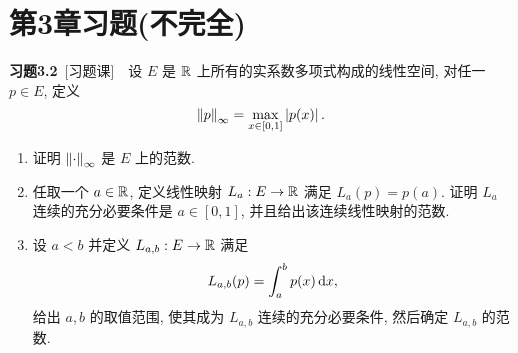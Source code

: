 \section{第3章习题(不完全)}

	\textbf{习题3.2}\ [习题课]\ \ 设 $ E $ 是 $ \mathbb{R} $ 上所有的实系数多项式构成的线性空间, 对任一 $ p\in E $, 定义
	\[
		\left\| p \right\|_{\infty}=\max_{x\in[0, 1]}\left| p(x) \right| .
	\]
	\begin{enumerate}[(1)]
		\item 证明 $ \left\| \cdot \right\|_{\infty} $ 是 $ E $ 上的范数.
		\item 任取一个 $ a\in\mathbb{R} $, 定义线性映射 $ L_{a}:E\to \mathbb{R} $ 满足 $ L_{a}(p)=p(a) $. 证明 $ L_{a} $ 连续的充分必要条件是 $ a\in[0, 1] $, 并且给出该连续线性映射的范数.
		\item 设 $ a<b $ 并定义 $ L_{a, b}:E\to \mathbb{R} $ 满足
		\[
			L_{a, b}(p)=\int_{a}^{b}p(x)\,\mathrm{d} x,
		\]
		给出 $ a, b $ 的取值范围, 使其成为 $ L_{a, b} $ 连续的充分必要条件, 然后确定 $ L_{a, b} $ 的范数.
	\end{enumerate}

